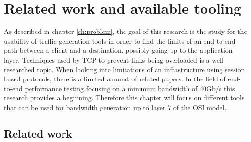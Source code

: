 \chapter{Related work and available tooling}\label{ch:related}
As described in chapter \ref{ch:problem}, the goal of this research is the study for the usability of traffic generation tools in order to find the limits of an end-to-end path between a client and a destination, possibly going up to the application layer.
Techniques used by TCP to prevent links being overloaded is a well researched topic. 
When looking into limitations of an infrastructure using session based protocols, there is a limited amount of related papers. 
In the field of end-to-end performance testing focusing on a minimum bandwidth of 40Gb/s this research provides a beginning.
Therefore this chapter will focus on different tools that can be used for bandwidth generation up to layer 7 of the OSI model.

\section{Related work}

